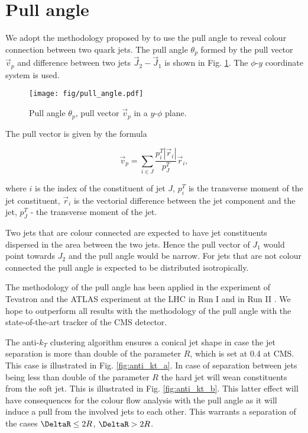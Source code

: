 \section{Pull angle}

We adopt the methodology proposed by \cite{Gallicchio:2010sw} to use the pull angle to reveal colour connection between two quark jets. The pull angle $\theta_{p}$ formed by the pull vector $\vec{v}_{p}$ and difference between two jets $\vec{J}_{2}-\vec{J}_{1}$ is shown in Fig. \ref{fig:pull_angle}. The $\phi$-$y$ coordinate system is used. 

\begin{figure}[hbtp]
  \centering
  \texttt{[image: fig/pull\_angle.pdf]}
  \caption{Pull angle $\theta_{p}$, pull vector $\vec{v}_{p}$ in a $y$-$\phi$ plane.}
  \label{fig:pull_angle}
\end{figure}

The pull vector is given by the formula

\begin{equation}
  \vec{v}_{p}=\sum_{i\in J}\frac{p^{T}_{i}|\vec{r}_{i}|}{p^{T}_{J}}\vec{r}_{i},
  \label{Eq:pull_angle}
\end{equation}

where $i$ is the index of the constituent of jet $J$, $p^{T}_{i}$ is the transverse moment of the jet constituent, $\vec{r}_{i}$ is the vectorial difference between the jet component and the jet, $p^{T}_{J}$ - the transverse moment of the jet.

Two jets that are colour connected are expected to have jet constituents dispersed in the area between the two jets. Hence the pull vector of $J_{1}$ would point towards $J_{2}$ and the pull angle would be narrow. For jets that are not colour connected the pull angle is expected to be distributed isotropically.

The methodology of the pull angle has been applied in the \DZERO experiment of Tevatron \cite{Abazov:2011vh} and the ATLAS experiment at the LHC in Run I \cite{Aad:2015lxa} and in Run II \cite{ATLAS:2017iaz}. We hope to outperform all results with the methodology of the pull angle with the state-of-the-art tracker of the CMS detector.

The anti-$k_{T}$ clustering algorithm ensures a conical jet shape in case the jet separation \DeltaR is more than double of the parameter $R$, which is set at 0.4 at CMS. This case is illustrated in Fig. \ref{fig:anti_kt_a}. In case of separation between jets \DeltaR being less than double of the parameter $R$ the hard jet will wean constituents from the soft jet. This is illustrated in Fig. \ref{fig:anti_kt_b}. This latter effect will have consequences for the colour flow analysis with the pull angle as it will induce a pull from the involved jets to each other. This warrants a separation of the cases $\DeltaR\leq2R$, $\DeltaR>2R$. 

